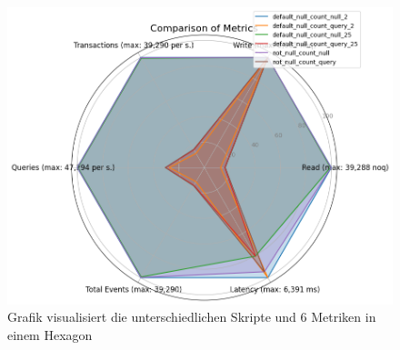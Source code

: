 \begin{figure}[!ht]
    \centering
    \includegraphics[width=.6\textwidth]{PNGs/Data_Types/Null/statistics}
    \caption[Data-Types-Null: Statistiken]{Grafik visualisiert die unterschiedlichen Skripte und 6 Metriken in einem Hexagon}
    \label{fig:data-types-null-statistics}
\end{figure}

